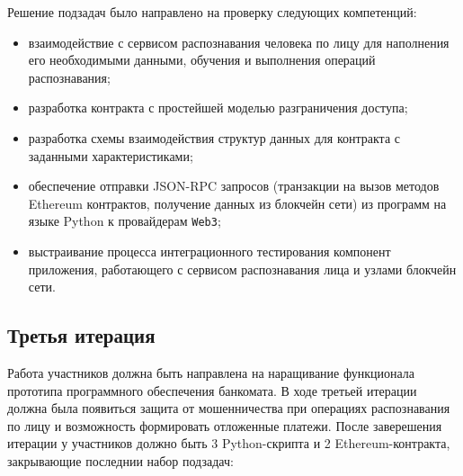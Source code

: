 Решение подзадач было направлено на проверку следующих компетенций:
\begin{itemize}
    \item взаимодействие с сервисом распознавания человека по лицу для наполнения
    его необходимыми данными, обучения и выполнения операций распознавания; 
    \item разработка контракта с простейшей моделью разграничения доступа;
    \item разработка схемы взаимодействия структур данных для контракта с
    заданными характеристиками;
    \item обеспечение отправки JSON-RPC запросов (транзакции на вызов методов
    Ethereum контрактов, получение данных из блокчейн сети) из программ на языке Python
    к провайдерам \texttt{Web3};
    \item выстраивание процесса интеграционного тестирования компонент приложения,
    работающего с сервисом распознавания лица и узлами блокчейн сети.
\end{itemize}

\subsection*{Третья итерация}

Работа участников должна быть направлена на наращивание функционала прототипа
программного обеспечения банкомата. В ходе третьей итерации должна была появиться
защита от мошенничества при операциях распознавания по лицу и возможность
формировать отложенные платежи.
После заверешения итерации у участников должно быть 3 Python-скрипта и
2 Ethereum-контракта, закрывающие последнии набор подзадач:

